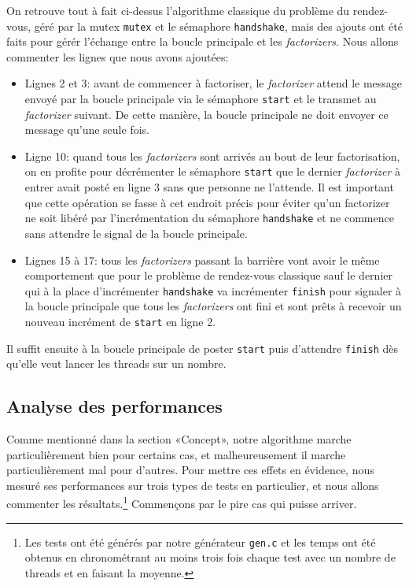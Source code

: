 \documentclass[a4paper,10pt]{article}
\begin{document}
On retrouve tout à fait ci-dessus l'algorithme classique du problème du rendez-vous, géré par la mutex \texttt{mutex} et le sémaphore \texttt{handshake}, mais des ajouts ont été faits pour gérér l'échange entre la boucle principale et les \emph{factorizers}. Nous allons commenter les lignes que nous avons ajoutées:
\begin{itemize}
    \item Lignes 2 et 3: avant de commencer à factoriser, le \emph{factorizer} attend le message envoyé par la boucle principale via le sémaphore \texttt{start} et le transmet au \emph{factorizer} suivant. De cette manière, la boucle principale ne doit envoyer ce message qu'une seule fois.
    \item Ligne 10: quand tous les \emph{factorizers} sont arrivés au bout de leur factorisation, on en profite pour décrémenter le sémaphore \texttt{start} que le dernier \emph{factorizer} à entrer avait posté en ligne 3 sans que personne ne l'attende. Il est important que cette opération se fasse à cet endroit précis pour éviter qu'un factorizer ne soit libéré par l'incrémentation du sémaphore \texttt{handshake} et ne commence sans attendre le signal de la boucle principale.
    \item Lignes 15 à 17: tous les \emph{factorizers} passant la barrière vont avoir le même comportement que pour le problème de rendez-vous classique sauf le dernier qui à la place d'incrémenter \texttt{handshake} va incrémenter \texttt{finish} pour signaler à la boucle principale que tous les \emph{factorizers} ont fini et sont prêts à recevoir un nouveau incrément de \texttt{start} en ligne 2.
\end{itemize}

Il suffit ensuite à la boucle principale de poster \texttt{start} puis d'attendre \texttt{finish} dès qu'elle veut lancer les threads sur un nombre.

\subsection*{Analyse des performances}

Comme mentionné dans la section «Concept», notre algorithme marche particulièrement bien pour certains cas, et malheureusement il marche particulièrement mal pour d'autres. Pour mettre ces effets en évidence, nous mesuré ses performances sur trois types de tests en particulier, et nous allons commenter les résultats.\footnote{Les tests ont été générés par notre générateur \texttt{gen.c} et les temps ont été obtenus en chronométrant au moins trois fois chaque test avec un nombre de threads et en faisant la moyenne.} Commençons par le pire cas qui puisse arriver.
\end{document}

